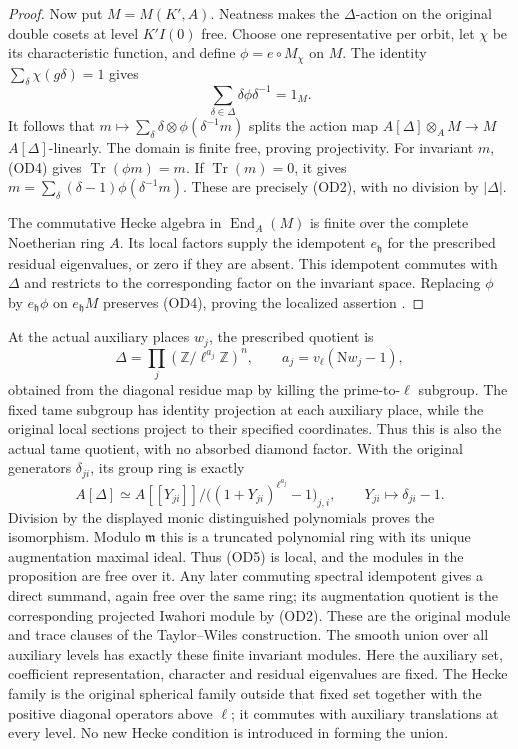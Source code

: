 \begin{proof}
Now put $M=M(K',A)$. Neatness makes the $\Delta$-action on
the original double cosets at level $K'I(0)$ free. Choose one
representative per orbit, let $\chi$ be its characteristic
function, and define $\phi=e\circ M_\chi$ on $M$.
The identity $\sum_\delta\chi(g\delta)=1$ gives
\[
 \sum_{\delta\in\Delta}\delta\phi\delta^{-1}=1_M.
 \tag{OD4}
\]
It follows that
$m\mapsto\sum_\delta\delta\otimes\phi(\delta^{-1}m)$
splits the action map $A[\Delta]\otimes_AM\to M$
$A[\Delta]$-linearly. The domain is finite free, proving
projectivity. For invariant $m$, (OD4) gives
$\operatorname{Tr}(\phi m)=m$. If $\operatorname{Tr}(m)=0$,
it gives
$m=\sum_\delta(\delta-1)\phi(\delta^{-1}m)$.
These are precisely (OD2), with no division by $|\Delta|$.

The commutative Hecke algebra in $\operatorname{End}_A(M)$
is finite over the complete Noetherian ring $A$. Its local
factors supply the idempotent $e_{\mathfrak h}$ for the
prescribed residual eigenvalues, or zero if they are absent.
This idempotent commutes with $\Delta$ and restricts to the
corresponding factor on the invariant space. Replacing $\phi$
by $e_{\mathfrak h}\phi$ on $e_{\mathfrak h}M$ preserves
(OD4), proving the localized assertion
\cite{alpo-ordinary-diamond}.
\end{proof}

At the actual auxiliary places $w_j$, the prescribed quotient is
\[
 \Delta=\prod_j(\mathbb Z/\ell^{a_j}\mathbb Z)^n,\qquad
 a_j=v_\ell(\mathrm Nw_j-1),
\]
obtained from the diagonal residue map by killing the
prime-to-$\ell$ subgroup. The fixed tame subgroup has identity
projection at each auxiliary place, while the original local
sections project to their specified coordinates. Thus this is
also the actual tame quotient, with no absorbed diamond factor.
With the original generators
$\delta_{ji}$, its group ring is exactly
\[
 A[\Delta]\simeq
 A[[Y_{ji}]]/
   \bigl((1+Y_{ji})^{\ell^{a_j}}-1\bigr)_{j,i},
 \qquad Y_{ji}\longmapsto\delta_{ji}-1.
 \tag{OD5}
\]
Division by the displayed monic distinguished polynomials proves
the isomorphism. Modulo $\mathfrak m$ this is a truncated polynomial
ring with its unique augmentation maximal ideal. Thus (OD5) is
local, and the modules in the proposition are free over it.
Any later commuting spectral idempotent gives a direct summand,
again free over the same ring; its augmentation quotient is the
corresponding projected Iwahori module by (OD2).
These are the original module and trace clauses of the
Taylor--Wiles construction. The smooth union over all auxiliary
levels has exactly these finite invariant modules. Here the
auxiliary set, coefficient representation, character and residual
eigenvalues are fixed. The Hecke family is the original spherical
family outside that fixed set together with the positive diagonal
operators above $\ell$; it commutes with auxiliary translations
at every level. No new Hecke condition is introduced in forming
the union.

